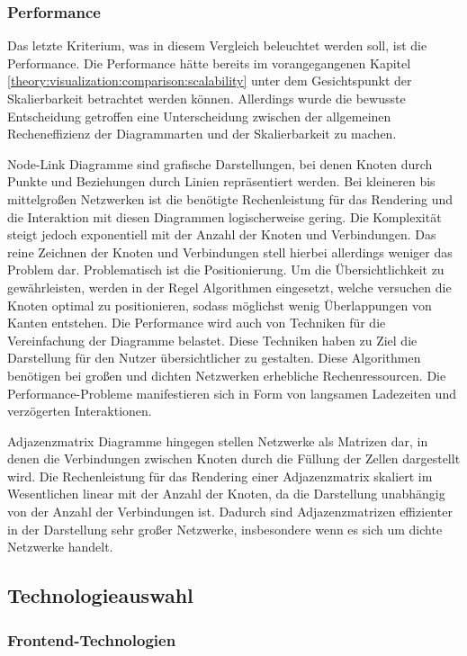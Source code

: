 \subsubsection{Performance}
\label{theory:visualization:comparison:performance}

Das letzte Kriterium, was in diesem Vergleich beleuchtet werden soll, ist die Performance. Die Performance hätte bereits im vorangegangenen Kapitel \ref{theory:visualization:comparison:scalability} unter dem Gesichtspunkt der Skalierbarkeit betrachtet werden können. Allerdings wurde die bewusste Entscheidung getroffen eine Unterscheidung zwischen der allgemeinen Recheneffizienz der Diagrammarten und der Skalierbarkeit zu machen.

Node-Link Diagramme sind grafische Darstellungen, bei denen Knoten durch Punkte und Beziehungen durch Linien repräsentiert werden. Bei kleineren bis mittelgroßen Netzwerken ist die benötigte Rechenleistung für das Rendering und die Interaktion mit diesen Diagrammen logischerweise gering. Die Komplexität steigt jedoch exponentiell mit der Anzahl der Knoten und Verbindungen. Das reine Zeichnen der Knoten und Verbindungen stell hierbei allerdings weniger das Problem dar. Problematisch ist die Positionierung. Um die Übersichtlichkeit zu gewährleisten, werden in der Regel Algorithmen eingesetzt, welche versuchen die Knoten optimal zu positionieren, sodass möglichst wenig Überlappungen von Kanten entstehen. Die Performance wird auch von Techniken für die Vereinfachung der Diagramme belastet. Diese Techniken haben zu Ziel die Darstellung für den Nutzer übersichtlicher zu gestalten.  Diese Algorithmen benötigen bei großen und dichten Netzwerken erhebliche Rechenressourcen. Die Performance-Probleme manifestieren sich in Form von langsamen Ladezeiten und verzögerten Interaktionen.

Adjazenzmatrix Diagramme hingegen stellen Netzwerke als Matrizen dar, in denen die Verbindungen zwischen Knoten durch die Füllung der Zellen dargestellt wird. Die Rechenleistung für das Rendering einer Adjazenzmatrix skaliert im Wesentlichen linear mit der Anzahl der Knoten, da die Darstellung unabhängig von der Anzahl der Verbindungen ist. Dadurch sind Adjazenzmatrizen effizienter in der Darstellung sehr großer Netzwerke, insbesondere wenn es sich um dichte Netzwerke handelt.

\subsection{Technologieauswahl}
\subsubsection{Frontend-Technologien}
